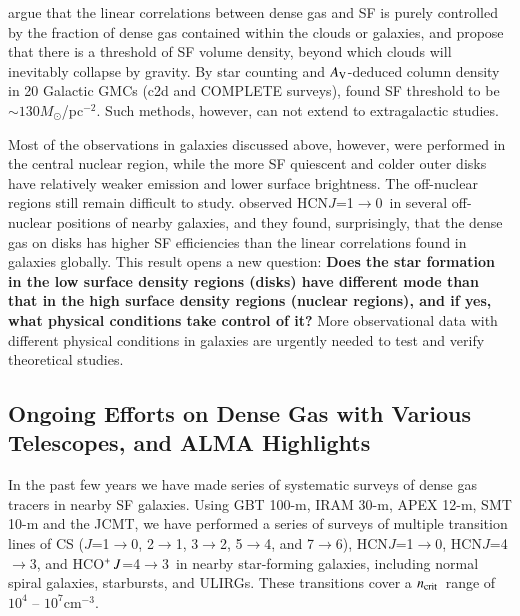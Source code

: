 \documentclass[legal,11pt]{article}
\def\cmt   {cm$^{-3}$\,}
\def\,{\thinspace}
\def\Msun{$M_\odot$}
\def\to{$\rightarrow$}
\def\Lcs    {$L'_{\rm CS}$}
\def\ncrit{$n_{\rm crit}$}
\def\LIR     {$L_{\rm IR}$}
\def\HCNoz      {HCN\,$J$=1$\rightarrow$0}
\def\HCNft        {HCN\,$J$=4$\rightarrow$3}
\def\HCOPft     {HCO$^+\,J$=4$\rightarrow$3}
\begin{document}
\citet{Lada12} argue that the linear correlations between dense gas and SF is
purely controlled by the fraction of dense gas contained within the clouds or
galaxies, and propose that there is a threshold of SF volume density, beyond
which clouds will inevitably collapse by gravity. By star counting and $A_{\rm
V}$-deduced column density in 20 Galactic GMCs (c2d and COMPLETE surveys),
\citet{Heiderman2010} found SF threshold to be $\sim 130$\Msun/pc$^{-2}$.  Such
methods, however, can not extend to extragalactic studies. 


Most of the observations in galaxies discussed above, however, were performed
in  the central nuclear region, while the more SF quiescent and colder outer
disks have relatively weaker emission and lower surface brightness. The
off-nuclear regions still remain difficult to study. \citet{usero15} observed
\HCNoz\ in several off-nuclear positions of nearby galaxies, and they found,
surprisingly, that the dense gas on disks has higher SF efficiencies than the
linear correlations found in galaxies globally. This result opens a new
question: {\bf Does the star formation in the low surface density regions
(disks) have different mode than that in the high surface density regions
(nuclear regions), and if yes, what physical conditions take control of it?}
More observational data with different physical conditions in galaxies are
urgently needed to test and verify theoretical studies. 


\subsection{Ongoing Efforts on Dense Gas with Various Telescopes, and ALMA
Highlights} 

In the past few years we have made series of systematic surveys of dense gas
tracers in nearby SF galaxies. Using GBT 100-m, IRAM 30-m, APEX 12-m, SMT 10-m and the JCMT, we have
performed a series of surveys of multiple transition lines of CS ($J$=1\to0,
2\to1, 3\to2, 5\to4, and 7\to6), \HCNoz, \HCNft, and \HCOPft\ in nearby
star-forming galaxies, including normal spiral galaxies, starbursts, and ULIRGs.
These transitions cover a \ncrit\ range of  $10^4$ -- $10^7$\cmt. 

\end{document}
